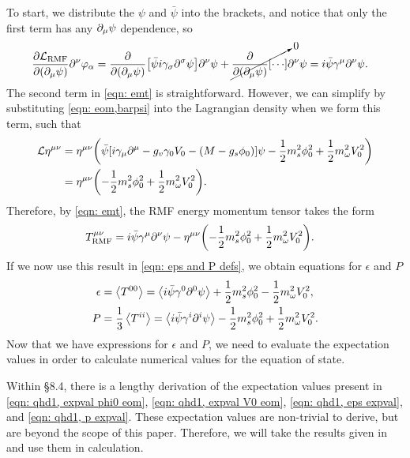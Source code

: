To start, we distribute the $\psi$ and $\bar\psi$ into the brackets, and notice that only the first term has any $\partial_\mu \psi$ dependence, so
\begin{align}
    \pdv{\Lag_\text{RMF}}{(\p_\mu \psi)} \p^\nu \varphi_\alpha & = \pdv{(\p_\mu \psi)}\bqty{\bar\psi i \gamma_\sigma \p^\sigma\psi}\p^\nu \psi + \cancelto{0}{\pdv{(\p_\mu \psi)}\bqty{\cdots}} \p^\nu \psi = i\bar\psi\gamma^\mu \p^\nu \psi.
\end{align}
The second term in \eqref{eqn: emt} is straightforward. However, we can simplify by substituting \eqref{eqn: eom,barpsi} into the Lagrangian density when we form this term, such that
\begin{align}
    \Lag \eta^{\mu\nu} &= \eta^{\mu\nu}\pqty{\bar\psi \bqty{i\gamma_\mu\p^\mu - g_v \gamma_0 V_0 - (M-g_s\phi_0)} \psi - \frac{1}{2} m_s^2 \phi_0^2 + \frac{1}{2} m_\omega^2 V_0^2}\nonumber\\
    & = \eta^{\mu\nu} \pqty{- \frac{1}{2} m_s^2 \phi_0^2 + \frac{1}{2} m_\omega^2 V_0^2}.
\end{align}
Therefore, by \eqref{eqn: emt}, the RMF energy momentum tensor takes the form
\begin{align}
    T^{\mu\nu}_\text{RMF} & =i\bar\psi\gamma^\mu \p^\nu \psi - \eta^{\mu\nu} \pqty{- \frac{1}{2} m_s^2 \phi_0^2 + \frac{1}{2} m_\omega^2 V_0^2}.
\end{align}
If we now use this result in \eqref{eqn: eps and P defs}, we obtain equations for $\epsilon$ and $P$
\begin{align}
    \epsilon & = \expval{T^{00}} = \expval{i\bar\psi\gamma^0 \partial^0 \psi} + \frac{1}{2} m_s^2 \phi_0^2 - \frac{1}{2} m_\omega^2 V_0^2,\label{eqn: qhd1, eps expval}\\
    P &= \frac{1}{3}\expval{T^{ii}} = \expval{i\bar\psi\gamma^i \partial^i \psi}  - \frac{1}{2} m_s^2 \phi_0^2 + \frac{1}{2} m_\omega^2 V_0^2. \label{eqn: qhd1, p expval}
\end{align}
Now that we have expressions for $\epsilon$ and $P$, we need to evaluate the expectation values in order to calculate numerical values for the equation of state.

Within \autocite{diener_2008} \S 8.4, there is a lengthy derivation of the expectation values present in \eqref{eqn: qhd1, expval phi0 eom}, \eqref{eqn: qhd1, expval V0 eom}, \eqref{eqn: qhd1, eps expval}, and \eqref{eqn: qhd1, p expval}. These expectation values are non-trivial to derive, but are beyond the scope of this paper. Therefore, we will take the results given in \autocite{diener_2008} and use them in calculation.

